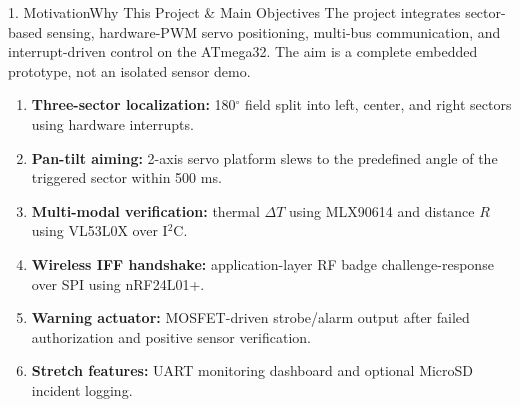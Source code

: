 \documentclass[aspectratio=169, 10pt]{beamer}
\begin{document}
\begin{frame}{1. Motivation}{Why This Project \& Main Objectives}
    \small The project integrates sector-based sensing, hardware-PWM servo positioning, multi-bus communication, and interrupt-driven control on the ATmega32. The aim is a complete embedded prototype, not an isolated sensor demo.
    \vspace{0.2cm}
    \begin{enumerate}
        \small
        \item \textbf{Three-sector localization:} 180$^\circ$ field split into left, center, and right sectors using hardware interrupts.
        \item \textbf{Pan-tilt aiming:} 2-axis servo platform slews to the predefined angle of the triggered sector within 500 ms.
        \item \textbf{Multi-modal verification:} thermal $\Delta T$ using MLX90614 and distance $R$ using VL53L0X over I$^2$C.
        \item \textbf{Wireless IFF handshake:} application-layer RF badge challenge-response over SPI using nRF24L01+.
        \item \textbf{Warning actuator:} MOSFET-driven strobe/alarm output after failed authorization and positive sensor verification.
        \item \textbf{Stretch features:} UART monitoring dashboard and optional MicroSD incident logging.
    \end{enumerate}
\end{frame}
\end{document}
